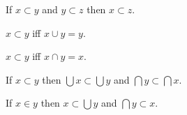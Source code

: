 \documentclass[a4paper,draft]{amsproc}
\begin{document}
\begin{forthel}
\begin{theorem}[28]
If $x \subset y$ and $y \subset z$ then $x \subset z$.
\end{theorem}

\begin{theorem}[29]
$x \subset y$ iff $x \cup y = y$.
\end{theorem}

\begin{theorem}[30]
$x \subset y$ iff $x \cap y = x$.
\end{theorem}

\begin{theorem}[31]
If $x \subset y$ then $\bigcup x \subset \bigcup y$
and $\bigcap y \subset \bigcap x$.
\end{theorem}

\begin{theorem}[32]
If $x \in y$ then $x \subset \bigcup y$ 
and $\bigcap y \subset x$.
\end{theorem}

\end{forthel}
\end{document}
